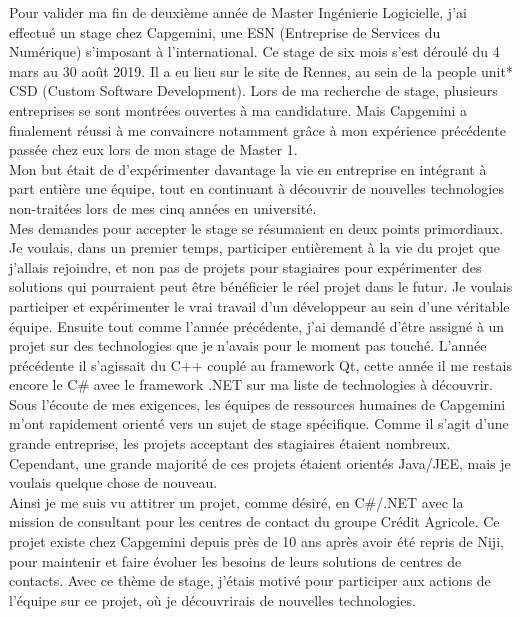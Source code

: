 \documentclass{rapport}
\begin{document}
Pour valider ma fin de deuxième année de Master Ingénierie Logicielle, j'ai effectué un stage chez Capgemini, une ESN (Entreprise de Services du Numérique) s'imposant à l'international. Ce stage de six mois s'est déroulé du 4 mars au 30 août 2019. Il a eu lieu sur le site de Rennes, au sein de la people unit* CSD (Custom Software Development).
Lors de ma recherche de stage, plusieurs entreprises se sont montrées ouvertes à ma candidature. Mais Capgemini a finalement réussi à me convaincre notamment grâce à mon expérience précédente passée chez eux lors de mon stage de Master 1.
\\

Mon but était de d'expérimenter davantage la vie en entreprise en intégrant à part entière une équipe, tout en continuant à découvrir de nouvelles technologies non-traitées lors de mes cinq années en université.
\\
Mes demandes pour accepter le stage se résumaient en deux points primordiaux.
Je voulais, dans un premier temps, participer entièrement à la vie du projet que j'allais rejoindre, et non pas de projets pour stagiaires pour expérimenter des solutions qui pourraient peut être bénéficier le réel projet dans le futur. Je voulais participer et expérimenter le vrai travail d'un développeur au sein d'une véritable équipe.
Ensuite tout comme l'année précédente, j'ai demandé d'être assigné à un projet sur des technologies que je n'avais pour le moment pas touché. L'année précédente il s'agissait du C++ couplé au framework Qt, cette année il me restais encore le C\# avec le framework .NET sur ma liste de technologies à découvrir.\\
Sous l'écoute de mes exigences, les équipes de ressources humaines de Capgemini m'ont rapidement orienté vers un sujet de stage spécifique. Comme il s'agit d'une grande entreprise, les projets acceptant des stagiaires étaient nombreux. Cependant, une grande majorité de ces projets étaient orientés Java/JEE, mais je voulais quelque chose de nouveau.\\

Ainsi je me suis vu attitrer un projet, comme désiré, en C\#/.NET avec la mission de consultant pour les centres de contact du groupe Crédit Agricole. Ce projet existe chez Capgemini depuis près de 10 ans après avoir été repris de Niji, pour maintenir et faire évoluer les besoins de leurs solutions de centres de contacts. Avec ce thème de stage, j'étais motivé pour participer aux actions de l'équipe sur ce projet, où je découvrirais de nouvelles technologies.
\end{document}
